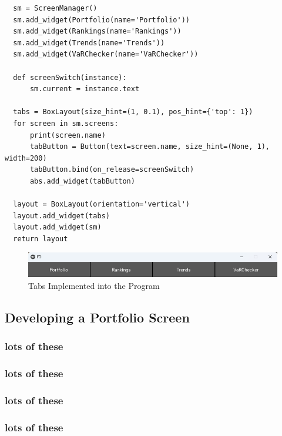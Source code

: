 \documentclass{article}
\begin{document}
\begin{verbatim}
  sm = ScreenManager()        
  sm.add_widget(Portfolio(name='Portfolio'))
  sm.add_widget(Rankings(name='Rankings'))
  sm.add_widget(Trends(name='Trends'))
  sm.add_widget(VaRChecker(name='VaRChecker'))

  def screenSwitch(instance):
      sm.current = instance.text

  tabs = BoxLayout(size_hint=(1, 0.1), pos_hint={'top': 1})
  for screen in sm.screens:
      print(screen.name)
      tabButton = Button(text=screen.name, size_hint=(None, 1), width=200)
      tabButton.bind(on_release=screenSwitch)
      abs.add_widget(tabButton)

  layout = BoxLayout(orientation='vertical')
  layout.add_widget(tabs)
  layout.add_widget(sm)
  return layout
\end{verbatim}

\begin{figure}[h]
  \centering
  \includegraphics[width=1\textwidth]{Images/Term 2 Images/tabs.png}
  \caption{Tabs Implemented into the Program}
  \label{fig:Tabs}
\end{figure}



\subsection{Developing a Portfolio Screen}

\subsubsection{lots of these}

\subsubsection{lots of these}

\subsubsection{lots of these}

\subsubsection{lots of these}
\end{document}

